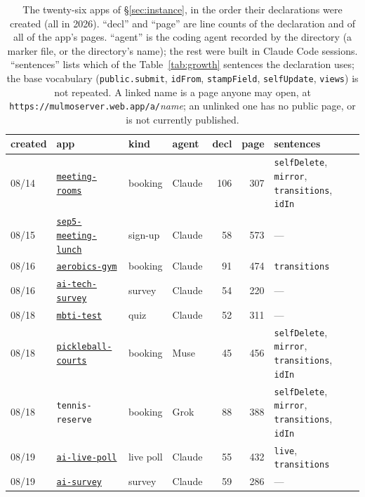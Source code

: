 \begin{table}[p]
\caption{The twenty-six apps of \S\ref{sec:instance}, in the order their declarations were created (all in 2026). ``decl'' and ``page'' are line counts of the declaration and of all of the app's pages. ``agent'' is the coding agent recorded by the directory (a marker file, or the directory's name); the rest were built in Claude Code sessions. ``sentences'' lists which of the Table~\ref{tab:growth} sentences the declaration uses; the base vocabulary (\texttt{public.submit}, \texttt{idFrom}, \texttt{stampField}, \texttt{selfUpdate}, \texttt{views}) is not repeated. A linked name is a page anyone may open, at \texttt{https://mulmoserver.web.app/a/}\emph{name}; an unlinked one has no public page, or is not currently published.}
\label{tab:appendix}
\centering
\scriptsize
\begin{tabular}{@{}llllrr>{\raggedright\arraybackslash}p{4.6cm}@{}}
\toprule
created & app & kind & agent & decl & page & sentences \\
\midrule
08/14 & \href{https://mulmoserver.web.app/a/meeting-rooms}{\texttt{meeting-rooms}} & booking & Claude & 106 & 307 & \texttt{selfDelete}, \texttt{mirror}, \texttt{transitions}, \texttt{idIn} \\
08/15 & \href{https://mulmoserver.web.app/a/sep5-meeting-lunch}{\texttt{sep5-meeting-lunch}} & sign-up & Claude & 58 & 573 & --- \\
08/16 & \href{https://mulmoserver.web.app/a/aerobics-gym}{\texttt{aerobics-gym}} & booking & Claude & 91 & 474 & \texttt{transitions} \\
08/16 & \href{https://mulmoserver.web.app/a/ai-tech-survey}{\texttt{ai-tech-survey}} & survey & Claude & 54 & 220 & --- \\
08/18 & \href{https://mulmoserver.web.app/a/mbti-test}{\texttt{mbti-test}} & quiz & Claude & 52 & 311 & --- \\
08/18 & \href{https://mulmoserver.web.app/a/pickleball-courts}{\texttt{pickleball-courts}} & booking & Muse & 45 & 456 & \texttt{selfDelete}, \texttt{mirror}, \texttt{transitions}, \texttt{idIn} \\
08/18 & \texttt{tennis-reserve} & booking & Grok & 88 & 388 & \texttt{selfDelete}, \texttt{mirror}, \texttt{transitions}, \texttt{idIn} \\
08/19 & \href{https://mulmoserver.web.app/a/ai-live-poll}{\texttt{ai-live-poll}} & live poll & Claude & 55 & 432 & \texttt{live}, \texttt{transitions} \\
08/19 & \href{https://mulmoserver.web.app/a/ai-survey}{\texttt{ai-survey}} & survey & Claude & 59 & 286 & --- \\

\end{tabular}
\end{table}
